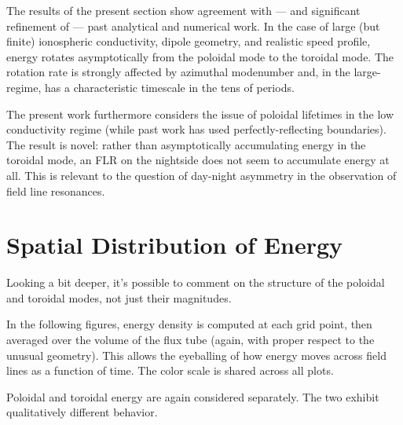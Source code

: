 The results of the present section show agreement with --- and significant refinement of --- past analytical and numerical work. In the case of large (but finite) ionospheric conductivity, dipole geometry, and realistic \Alfven speed profile, energy rotates asymptotically from the poloidal mode to the toroidal mode. The rotation rate is strongly affected by azimuthal modenumber and, in the large-\azm regime, has a characteristic timescale in the tens of periods. 


The present work furthermore considers the issue of poloidal lifetimes in the low conductivity regime (while past work has used perfectly-reflecting boundaries). The result is novel: rather than asymptotically accumulating energy in the toroidal mode, an FLR on the nightside does not seem to accumulate energy at all. This is relevant to the question of day-night asymmetry in the observation of field line resonances. 

\section{Spatial Distribution of Energy}
  \label{sec_layers}

Looking a bit deeper, it's possible to comment on the structure of the poloidal and toroidal modes, not just their magnitudes. 


In the following figures, energy density is computed at each grid point, then averaged over the volume of the flux tube (again, with proper respect to the unusual geometry). This allows the eyeballing of how energy moves across field lines as a function of time. The color scale is shared across all plots. 

Poloidal and toroidal energy are again considered separately. The two exhibit qualitatively different behavior. 


